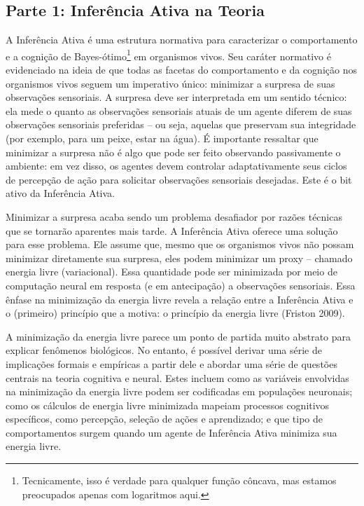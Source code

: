 \documentclass[
  12pt,
]{book}
\begin{document}
\hypertarget{parte-1-inferuxeancia-ativa-na-teoria}{%
\subsection{Parte 1: Inferência Ativa na Teoria}\label{parte-1-inferuxeancia-ativa-na-teoria}}

A Inferência Ativa é uma estrutura normativa para caracterizar o comportamento e a cognição de Bayes-ótimo\footnote{Tecnicamente, isso é verdade para qualquer função côncava, mas
  estamos preocupados apenas com logaritmos aqui.} em organismos vivos. Seu caráter normativo é evidenciado na ideia de que todas as facetas do comportamento e da cognição nos organismos vivos seguem um imperativo único: minimizar a surpresa de suas observações sensoriais. A surpresa deve ser interpretada em um sentido técnico: ela mede o quanto as observações sensoriais atuais de um agente diferem de suas observações sensoriais preferidas -- ou seja, aquelas que preservam sua integridade (por exemplo, para um peixe, estar na água). É importante ressaltar que minimizar a surpresa não é algo que pode ser feito observando passivamente o ambiente: em vez disso, os agentes devem controlar adaptativamente seus ciclos de percepção de ação para solicitar observações sensoriais desejadas. Este é o bit ativo da Inferência Ativa.

Minimizar a surpresa acaba sendo um problema desafiador por razões técnicas que se tornarão aparentes mais tarde. A Inferência Ativa oferece uma solução para esse problema. Ele assume que, mesmo que os organismos vivos não possam minimizar diretamente sua surpresa, eles podem minimizar um proxy -- chamado energia livre (variacional). Essa quantidade pode ser minimizada por meio de computação neural em resposta (e em antecipação) a observações sensoriais. Essa ênfase na minimização da energia livre revela a relação entre a Inferência Ativa e o (primeiro) princípio que a motiva: o princípio da energia livre (Friston 2009).

A minimização da energia livre parece um ponto de partida muito abstrato para explicar fenômenos biológicos. No entanto, é possível derivar uma série de implicações formais e empíricas a partir dele e abordar uma série de questões centrais na teoria cognitiva e neural. Estes incluem como as variáveis envolvidas na minimização da energia livre podem ser codificadas em populações neuronais; como os cálculos de energia livre minimizada mapeiam processos cognitivos específicos, como percepção, seleção de ações e aprendizado; e que tipo de comportamentos surgem quando um agente de Inferência Ativa minimiza sua energia livre.
\end{document}
